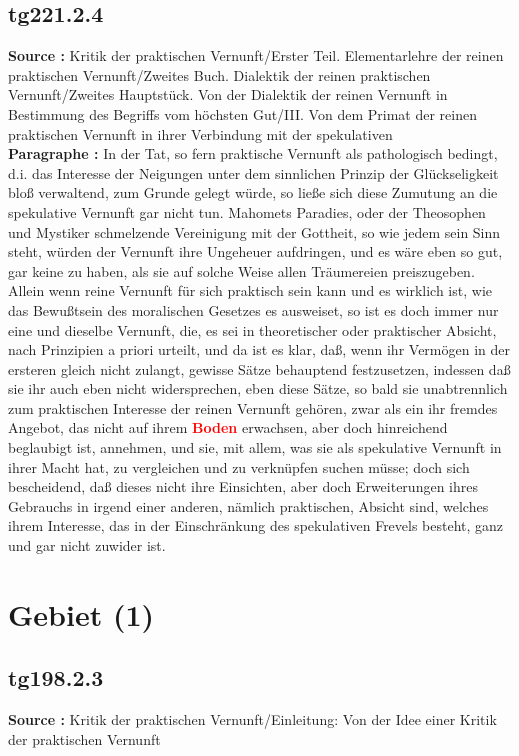 \documentclass[a4paper,12pt,twoside]{book}
\newcommand{\match}[1]{\textcolor{red}{\textbf{#1}}}
\newcommand{\unnumberedsection}[1]{
	\section*{#1}
	\addcontentsline{toc}{section}{#1}
	\markright{#1}
}
\begin{document}
	\subsection*{tg221.2.4} 
	\textbf{Source : }Kritik der praktischen Vernunft/Erster Teil. Elementarlehre der reinen praktischen Vernunft/Zweites Buch. Dialektik der reinen praktischen Vernunft/Zweites Hauptstück. Von der Dialektik der reinen Vernunft in Bestimmung des Begriffs vom höchsten Gut/III. Von dem Primat der reinen praktischen Vernunft in ihrer Verbindung mit der spekulativen\\  
	
	\textbf{Paragraphe : }
	In der Tat, so fern praktische Vernunft als pathologisch bedingt, d.i. das Interesse der Neigungen unter dem sinnlichen Prinzip der Glückseligkeit bloß verwaltend, zum Grunde gelegt würde, so ließe sich diese Zumutung an die spekulative Vernunft gar nicht tun. Mahomets Paradies, oder der Theosophen und Mystiker schmelzende Vereinigung mit der Gottheit, so wie jedem sein Sinn steht, würden der Vernunft ihre Ungeheuer aufdringen, und es wäre eben so gut, gar keine zu haben, als sie auf solche Weise allen Träumereien preiszugeben. Allein wenn reine Vernunft für sich praktisch sein kann und es wirklich ist, wie das Bewußtsein des moralischen Gesetzes es ausweiset, so ist es doch immer nur eine und dieselbe Vernunft, die, es sei in theoretischer oder praktischer Absicht, nach Prinzipien a priori urteilt, und da ist es klar, daß, wenn ihr Vermögen in der ersteren gleich nicht zulangt, gewisse Sätze behauptend festzusetzen, indessen daß sie ihr auch eben nicht widersprechen, eben diese Sätze, so bald sie unabtrennlich zum praktischen Interesse der reinen Vernunft gehören, zwar als ein ihr fremdes Angebot, das nicht auf ihrem \match{Boden} erwachsen, aber doch hinreichend beglaubigt ist, annehmen, und sie, mit allem, was sie als spekulative Vernunft in ihrer Macht hat, zu vergleichen und zu verknüpfen suchen müsse; doch sich bescheidend, daß dieses nicht ihre Einsichten, aber doch Erweiterungen ihres Gebrauchs in irgend einer anderen, nämlich praktischen, Absicht sind, welches ihrem Interesse, das in der Einschränkung des spekulativen Frevels besteht, ganz und gar nicht zuwider ist. 
	
	\unnumberedsection{Gebiet (1)} 
	\subsection*{tg198.2.3} 
	\textbf{Source : }Kritik der praktischen Vernunft/Einleitung: Von der Idee einer Kritik der praktischen Vernunft\\  
	
\end{document}
